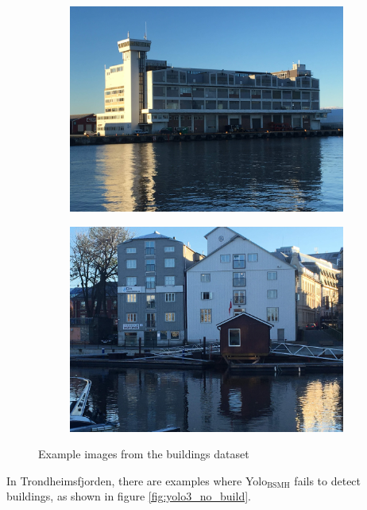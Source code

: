 \begin{figure}[h!]
\begin{subfigure}{.5\textwidth}
  \centering
  \includegraphics[width=0.8\linewidth]{discussion/buildings/IMG_2136.jpg}
\end{subfigure}%
\begin{subfigure}{.5\textwidth}
  \centering
  \includegraphics[width=.8\linewidth]{discussion/buildings/IMG_2085.jpg}
\end{subfigure}
\caption{Example images from the buildings dataset}
\label{fig:buildings}
\end{figure}

In Trondheimsfjorden, there are examples where Yolo$_{\text{BSMH}}$ fails to detect buildings, as shown in figure \ref{fig:yolo3_no_build}.

